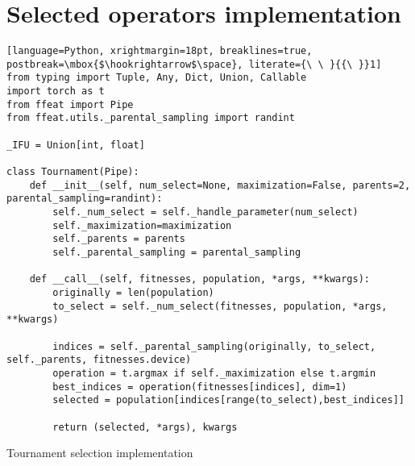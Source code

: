 \chapter{Selected operators implementation}
\label{chap:examples}

\begin{algorithm}
\begin{lstlisting}[language=Python, xrightmargin=18pt, breaklines=true, postbreak=\mbox{$\hookrightarrow$\space}, literate={\ \ }{{\ }}1]
from typing import Tuple, Any, Dict, Union, Callable
import torch as t
from ffeat import Pipe
from ffeat.utils._parental_sampling import randint

_IFU = Union[int, float]

class Tournament(Pipe):
    def __init__(self, num_select=None, maximization=False, parents=2, parental_sampling=randint):
        self._num_select = self._handle_parameter(num_select)
        self._maximization=maximization
        self._parents = parents
        self._parental_sampling = parental_sampling

    def __call__(self, fitnesses, population, *args, **kwargs):
        originally = len(population)
        to_select = self._num_select(fitnesses, population, *args, **kwargs)

        indices = self._parental_sampling(originally, to_select, self._parents, fitnesses.device)
        operation = t.argmax if self._maximization else t.argmin
        best_indices = operation(fitnesses[indices], dim=1)
        selected = population[indices[range(to_select),best_indices]]

        return (selected, *args), kwargs
\end{lstlisting}
\caption{Tournament selection implementation}
\label{alg:impltournament}
\end{algorithm}

